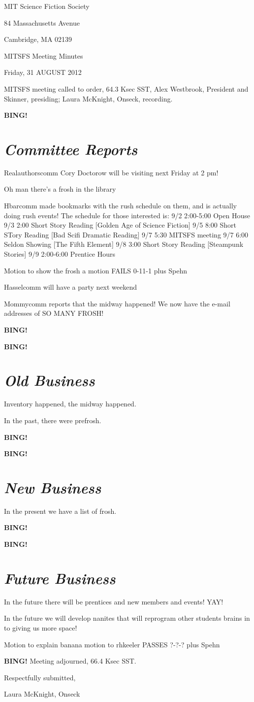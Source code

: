 \documentclass[10pt]{article}
\newcommand{\bing}{{\bf BING!} }
\newcommand{\goto}[1]{\bing \vskip 12pt \section*{{\em{#1}}}}
\newcommand{\ps}{ plus Spehn\xspace}
\newcommand{\skinner}{Alex Westbrook, President and Skinner}
\newcommand{\onseck}{Laura McKnight, Onseck}
\newcommand{\meetingdate}{Friday, 31 AUGUST 2012}
\begin{document}
\begin{center}

MIT Science Fiction Society

84 Massachusetts Avenue

Cambridge, MA 02139

\vspace{12pt}

MITSFS Meeting Minutes

\meetingdate

\end{center}

\vspace{18pt}

\setlength{\parskip}{6pt}

\noindent
MITSFS meeting called to order, 64.3 Ksec SST,
\skinner, presiding; \onseck, recording.


\goto{Committee Reports}
Realauthorscomm Cory Doctorow will be visiting next Friday at 2 pm!

Oh man there's a frosh in the library

Hbarcomm made bookmarks with the rush schedule on them, and is actually doing rush events! 
The schedule for those interested is:
9/2 2:00-5:00 Open House
9/3 2:00 Short Story Reading [Golden Age of Science Fiction]
9/5 8:00 Short STory Reading [Bad Scifi Dramatic Reading]
9/7 5:30 MITSFS meeting
9/7 6:00 Seldon Showing [The Fifth Element]
9/8 3:00 Short Story Reading [Steampunk Stories]
9/9 2:00-6:00 Prentice Hours

Motion to show the frosh a motion FAILS 0-11-1\ps

Hasselcomm will have a party next weekend

Mommycomm reports that the midway happened! We now have the e-mail addresses of SO MANY FROSH!

\bing

\goto{Old Business}

Inventory happened, the midway happened.

In the past, there were prefrosh.

\bing

\goto{New Business}

In the present we have a list of frosh.

\bing

\goto{Future Business}

In the future there will be prentices and new members and events! YAY!

In the future we will develop nanites that will reprogram other students brains in to giving us more space!

Motion to explain banana motion to rhkeeler PASSES ?-?-?\ps

\bing
\noindent
Meeting adjourned, 66.4 Ksec SST.

\vspace{18pt}

\centerline{Respectfully submitted,}
\centerline{\onseck}
\end{document}
